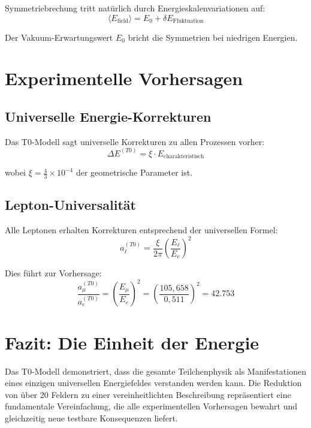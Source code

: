 \documentclass[12pt,a4paper]{report}
\begin{document}
	Symmetriebrechung tritt natürlich durch Energieskalenvariationen auf:
	\begin{equation}
		\langle E_{\text{field}} \rangle = E_0 + \delta E_{\text{Fluktuation}}
	\end{equation}
	
	Der Vakuum-Erwartungswert $E_0$ bricht die Symmetrien bei niedrigen Energien.
	
	\section{Experimentelle Vorhersagen}
	\label{sec:experimental_predictions}
	
	\subsection{Universelle Energie-Korrekturen}
	\label{subsec:universal_energy_corrections}
	
	Das T0-Modell sagt universelle Korrekturen zu allen Prozessen vorher:
	\begin{equation}
		\Delta E^{(T0)} = \xi \cdot E_{\text{charakteristisch}}
	\end{equation}
	
	wobei $\xi = \frac{4}{3} \times 10^{-4}$ der geometrische Parameter ist.
	
	\subsection{Lepton-Universalität}
	\label{subsec:lepton_universality}
	
	Alle Leptonen erhalten Korrekturen entsprechend der universellen Formel:
	\begin{equation}
		a_\ell^{(T0)} = \frac{\xi}{2\pi} \left(\frac{E_\ell}{E_e}\right)^2
	\end{equation}
	
	Dies führt zur Vorhersage:
	\begin{equation}
		\frac{a_\mu^{(T0)}}{a_e^{(T0)}} = \left(\frac{E_\mu}{E_e}\right)^2 = \left(\frac{105,658}{0,511}\right)^2 = 42.753
	\end{equation}
	
	\section{Fazit: Die Einheit der Energie}
	\label{sec:conclusion_unity}
	
	Das T0-Modell demonstriert, dass die gesamte Teilchenphysik als Manifestationen eines einzigen universellen Energiefeldes verstanden werden kann. Die Reduktion von über 20 Feldern zu einer vereinheitlichten Beschreibung repräsentiert eine fundamentale Vereinfachung, die alle experimentellen Vorhersagen bewahrt und gleichzeitig neue testbare Konsequenzen liefert.
	
\end{document}
